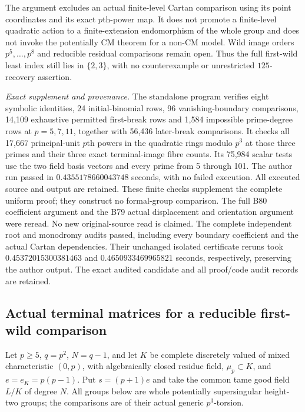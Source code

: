 \begin{remark}
\label{rem:B-RD81-scope}
The argument excludes an actual finite-level Cartan comparison
using its point coordinates and its exact \(p\)th-power map.
It does not promote a finite-level quadratic action to a
finite-extension endomorphism of the whole group and does
not invoke the potentially CM theorem for a non-CM model.
Wild image orders \(p^5,\ldots,p^8\) and reducible residual
comparisons remain open. Thus the full first-wild least
index still lies in \(\{2,3\}\), with no counterexample or
unrestricted \(125\)-recovery assertion.

\smallskip
\noindent\emph{Exact supplement and provenance.}
The standalone program
verifies eight symbolic identities, 24 initial-binomial rows,
96 vanishing-boundary comparisons, 14,109 exhaustive permitted
first-break rows and 1,584 impossible prime-degree rows at
\(p=5,7,11\), together with 56,436 later-break comparisons.
It checks all 17,667 principal-unit \(p\)th powers in the
quadratic rings modulo \(p^3\) at those three primes and
their three exact terminal-image fibre counts. Its 75,984
scalar tests use the two field basis vectors and every
prime from 5 through 101. The author run passed in
\(0.4355178660043748\) seconds, with no failed execution.
All executed source and output are retained. These finite
checks supplement the complete uniform proof; they construct
no formal-group comparison. The full B80 coefficient argument
and the B79 actual displacement and orientation argument were
reread. No new original-source read is claimed.
The complete independent root and monodromy audits passed,
including every boundary coefficient and the actual Cartan
dependencies. Their unchanged isolated certificate reruns took
\(0.45372015300381463\) and \(0.4650933469965821\) seconds,
respectively, preserving the author output. The exact audited
candidate and all proof/code audit records are retained.
\end{remark}


\subsection{Actual terminal matrices for a reducible first-wild comparison}

Let \(p\ge5\), \(q=p^2\), \(N=q-1\), and let \(K\) be complete
discretely valued of mixed characteristic \((0,p)\), with
algebraically closed residue field, \(\mu_p\subset K\), and
\(e=e_K=p(p-1)\). Put \(s=(p+1)e\) and take the common
tame good field \(L/K\) of degree \(N\). All groups below
are whole potentially supersingular height-two groups; the
comparisons are of their actual generic \(p^3\)-torsion.

